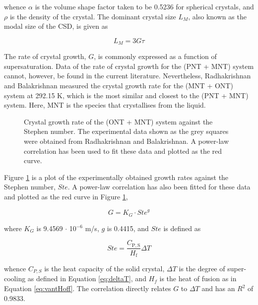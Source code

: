 \noindent whence $\alpha$ is the volume shape factor taken to be 0.5236 for spherical crystals, and $\rho$ is the density of the crystal. The dominant crystal size $L_M$, also known as the modal size of the CSD, is given as 

\begin{equation} \label{eq:LM G tau}
    L_M = 3 G \tau
\end{equation}

The rate of crystal growth, $G$, is commonly expressed as a function of supersaturation. Data of the rate of crystal growth for the (PNT + MNT) system cannot, however, be found in the current literature. Nevertheless, Radhakrishnan and Balakrishnan measured the crystal growth rate for the (MNT + ONT) system at 292.15 K, which is the most similar and closest to the (PNT + MNT) system. \cite{radhakrishnan_kinetics_1999} Here, MNT is the species that crystallises from the liquid.

\begin{figure}[h]
    \centering
    
    \caption{Crystal growth rate of the (ONT + MNT) system against the Stephen number. The experimental data shown as the grey squares were obtained from Radhakrishnan and Balakrishnan. \cite{radhakrishnan_kinetics_1999} A power-law correlation has been used to fit these data and plotted as the red curve.}
    \label{fig:ONT + MNT kinetics}
\end{figure}

Figure \ref{fig:ONT + MNT kinetics} is a plot of the experimentally obtained growth rates against the Stephen number, $Ste$. A power-law correlation has also been fitted for these data and plotted as the red curve in Figure \ref{fig:ONT + MNT kinetics},

\begin{equation}  \label{eq:KG Ste g}
    G = K_G \cdot {Ste}^{g}
\end{equation}

\noindent where $K_G$ is 9.4569 $\cdot$ 10$^{-6}$ m/s, $g$ is 0.4415, and $Ste$ is defined as 

\begin{equation}
    Ste = \frac{C_{\mathrm{P,S}}}{H_{\mathrm{f}}} \Delta T
\end{equation}

\noindent whence $C_{P,S}$ is the heat capacity of the solid crystal, $\Delta T$ is the degree of super-cooling as defined in Equation \ref{eq:deltaT}, and $H_{f}$ is the heat of fusion as in Equation \ref{eq:vantHoff}. The correlation directly relates $G$ to $\Delta T$ and has an $R^2$ of 0.9833.

